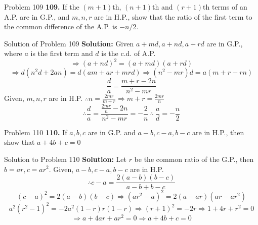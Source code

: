 \documentclass[aspectratio=1610,8pt]{beamer}
\begin{document}
\begin{frame}{Problem 109}
  \textbf{109.} If the $(m + 1)$th, $(n + 1)$th and $(r + 1)$th terms of an A.P. are in G.P., and $m, n, r$ are in H.P., show that
  the ratio of the first term to the common difference of the A.P. is $-n/2.$
\end{frame}
\begin{frame}{Solution of Problem 109}
  \textbf{Solution:} Given $a + md, a + nd, a + rd$ are in G.P., where $a$ is the first term and $d$ is the c.d. of A.P.
  $$\Rightarrow (a + nd)^2 = (a + md)(a + rd)$$
  $$\Rightarrow d(n^2d + 2an) = d(am + ar + mrd)\Rightarrow (n^2 - mr)d = a(m + r - rn)$$
  $$\frac{d}{a} = \frac{m + r - 2n}{n^2 - mr}$$
  Given, $m, n, r$ are in H.P. $\therefore n = \frac{2mr}{m + r} \Rightarrow m + r = \frac{2mr}{n}$
  $$\therefore \frac{d}{a} = \frac{\frac{2mr}{n} - 2n}{n^2 - mr} = -\frac{2}{n}~\therefore~ \frac{a}{d} = -\frac{n}{2}$$
\end{frame}
\begin{frame}{Problem 110}
  \textbf{110.} If $a, b, c$ are in G.P. and $a - b, c - a, b - c$ are in H.P., then show that $a + 4b + c = 0$
\end{frame}
\begin{frame}{Solution to Problem 110}
  \textbf{Solution:} Let $r$ be the common ratio of the G.P., then $b = ar, c = ar^2.$ Given, $a - b, c - a, b - c$ are in H.P.
  $$\therefore c - a = \frac{2(a - b)(b - c)}{a - b + b - c}$$
  $$(c - a)^2 = 2(a - b)(b - c)\Rightarrow (ar^2 - a)^2 = 2(a - ar)(ar - ar^2)$$
  $$a^2(r^2 - 1)^2 = -2a^2(1 - r)r(1 - r)\Rightarrow (r + 1)^2 = -2r \Rightarrow 1 + 4r + r^2 = 0$$
  $$\Rightarrow a + 4ar + ar^2 = 0 \Rightarrow a + 4b + c = 0$$
\end{frame}
\end{document}
